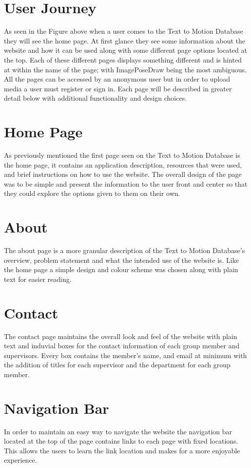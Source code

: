\documentclass{scrreprt}
\begin{document}
\section{User Journey}
As seen in the Figure above when a user comes to the Text to Motion Database they will see the home page. At first glance they see some information about the website and how it can be used along with some different page options located at the top. Each of these different pages displays something different and is hinted at within the name of the page; with ImagePoseDraw being the most ambiguous. All the pages can be accessed by an anonymous user but in order to upload media a user must register or sign in. Each page will be described in greater detail below with additional functionality and design choices. 

\section{Home Page}
As previously mentioned the first page seen on the Text to Motion Database is the home page, it contains an application description, resources that were used, and brief instructions on how to use the website. The overall design of the page was to be simple and present the information to the user front and center so that they could explore the options given to them on their own.

\section{About}
The about page is a more granular description of the Text to Motion Database’s overview, problem statement and what the intended use of the website is. Like the home page a simple design and colour scheme was chosen along with plain text for easier reading. 

\section{Contact}
The contact page maintains the overall look and feel of the website with plain text and induvial boxes for the contact information of each group member and supervisors. Every box contains the member’s name, and email at minimum with the addition of titles for each supervisor and the department for each group member. 

\section{Navigation Bar}
In order to maintain an easy way to navigate the website the navigation bar located at the top of the page contains links to each page with fixed locations. This allows the users to learn the link location and makes for a more enjoyable experience. 
\end{document}
